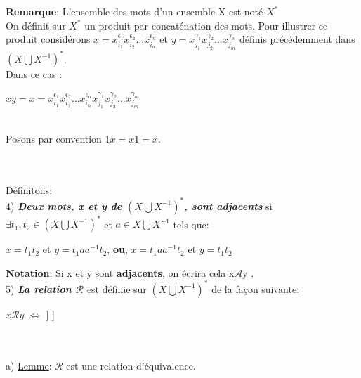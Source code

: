 \documentclass{article}
\begin{document}
\\
\\
\textbf{Remarque}: L'ensemble des mots d'un ensemble X est noté $X^{*}$
\\ On définit sur $X^{*}$ un produit par concaténation des mots. Pour illustrer ce produit considérons $x = x^{\epsilon_1}_{i_1} x^{\epsilon_2}_{i_2} \dots x^{\epsilon_n}_{i_n}$ et $y = x^{\gamma_1}_{j_1} x^{\gamma_2}_{j_2} \dots x^{\gamma_n}_{j_m}$ définis précédemment dans $(X\bigcup X^{-1})^{*}$.\\
Dans ce cas : 
\begin{center}$xy=x = x^{\epsilon_1}_{i_1} x^{\epsilon_2}_{i_2} \dots x^{\epsilon_n}_{i_n}x^{\gamma_1}_{j_1} x^{\gamma_2}_{j_2} \dots x^{\gamma_n}_{j_m}$ \end{center}\\
Posons par convention $1x=x1=x$.\\

\\~\\
\begin{definitionbox}
\underline{Définitons}:
\\

4) \textit{\textbf{Deux mots, x et y de $(X \bigcup X^{-1})^{*}$, sont \underline{adjacents}}} si $\exists t_{1},t_{2} \in (X \bigcup X^{-1})^{*}$ et $a \in X \bigcup X^{-1}$ tels que:
\begin{center} $x = t_{1}t_{2}$ et $y=t_{1}aa^{-1}t_{2}$, \underline{\textbf{ou}}, $x = t_{1}aa^{-1}t_{2}$ et $y = t_{1}t_{2}$\end{center}

\textbf{Notation}: Si x et y sont \textbf{adjacents}, on écrira cela x$\mathcal{A}$y .
\\

5) \textbf{\textit{La relation $\mathcal{R}$}} est définie sur $(X\bigcup X^{-1})^{*}$ de la façon suivante:


\begin{center}
$x\mathcal{R}y$ $\Leftrightarrow$ \Bigr[ \exists $t_{1},\dots, t_{n}$ \in $(X\bigcup X^{-1})^{*}$ tels que $x=t_{1}$, $y=t_{n}$, et $t_{i}\mathcal{A}t_{i+1} $\hspace{0.1cm} \forall i \in [\![1,n-1]\!] \Bigr]\\
\end{center}
\end{definitionbox}
\\~\\

\parindent 0mm a) \underline{Lemme}:
 $\mathcal{R}$ est une relation d'équivalence.\\
\end{document}
